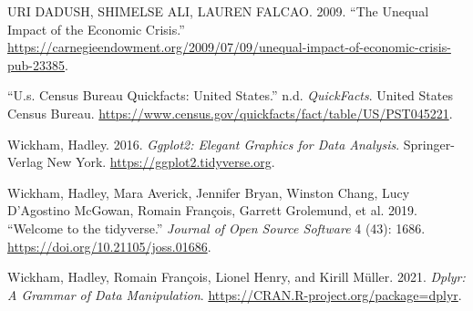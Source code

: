 \documentclass[
]{article}
\newlength{\cslhangindent}
\newlength{\cslentryspacingunit} %
\newenvironment{CSLReferences}[2] %
 {%
  \setlength{\parindent}{0pt}
  \ifodd #1
  \let\oldpar\par
  \def\par{\hangindent=\cslhangindent\oldpar}
  \fi
  \setlength{\parskip}{#2\cslentryspacingunit}
 }%
 {}
\begin{document}
\begin{CSLReferences}{1}{0}
\leavevmode{}%
URI DADUSH, SHIMELSE ALI, LAUREN FALCAO. 2009. {``The Unequal Impact of the Economic Crisis.''} \url{https://carnegieendowment.org/2009/07/09/unequal-impact-of-economic-crisis-pub-23385}.

\leavevmode{}%
{``U.s. Census Bureau Quickfacts: United States.''} n.d. \emph{QuickFacts}. United States Census Bureau. \url{https://www.census.gov/quickfacts/fact/table/US/PST045221}.

\leavevmode{}%
Wickham, Hadley. 2016. \emph{Ggplot2: Elegant Graphics for Data Analysis}. Springer-Verlag New York. \url{https://ggplot2.tidyverse.org}.

\leavevmode{}%
Wickham, Hadley, Mara Averick, Jennifer Bryan, Winston Chang, Lucy D'Agostino McGowan, Romain François, Garrett Grolemund, et al. 2019. {``Welcome to the {tidyverse}.''} \emph{Journal of Open Source Software} 4 (43): 1686. \url{https://doi.org/10.21105/joss.01686}.

\leavevmode{}%
Wickham, Hadley, Romain François, Lionel Henry, and Kirill Müller. 2021. \emph{Dplyr: A Grammar of Data Manipulation}. \url{https://CRAN.R-project.org/package=dplyr}.

\end{CSLReferences}
\end{document}
